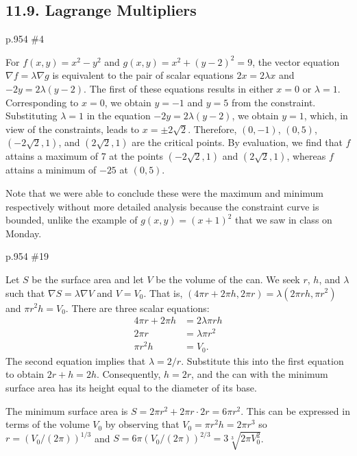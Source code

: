\subsection{11.9. Lagrange Multipliers}
\begin{practice}p.954 \#4\end{practice}
\begin{pracsol}
  For $f(x,y)=x^2-y^2$ and $g(x,y)=x^2+(y-2)^2=9$, the vector equation $\nabla f=\lambda \nabla g$ is equivalent to the pair of scalar equations $2x=2\lambda x$ and $-2y=2\lambda(y-2)$. The first of these equations results in either $x=0$ or $\lambda=1$. Corresponding to $x=0$, we obtain $y=-1$ and $y=5$ from the constraint. Substituting $\lambda=1$ in the equation $-2y=2\lambda(y-2)$, we obtain $y=1$, which, in view of the constraints, leads to $x=\pm2\sqrt2$. Therefore, $(0,-1)$, $(0,5)$, $(-2\sqrt2,1)$, and $(2\sqrt2,1)$ are the critical points. By evaluation, we find that $f$ attains a maximum of 7 at the points $(-2\sqrt2,1)$ and $(2\sqrt2,1)$, whereas $f$ attains a minimum of $-25$ at $(0,5)$.

  Note that we were able to conclude these were the maximum and minimum respectively without more detailed analysis because the constraint curve is bounded, unlike the example of $g(x,y)=(x+1)^2$ that we saw in class on Monday.
\end{pracsol}
\begin{practice}p.954 \#19\end{practice}
\begin{pracsol}
  Let $S$ be the surface area and let $V$ be the volume of the can. We seek $r$, $h$, and $\lambda$ such that $\nabla S=\lambda\nabla V$ and $V=V_0$. That is, $(4\pi r+2\pi h,2\pi r)=\lambda(2\pi rh,\pi r^2)$ and $\pi r^2h=V_0$. There are three scalar equations:
  \begin{align*}
    4\pi r+2\pi h &= 2\lambda\pi r h\\
    2\pi r &= \lambda\pi r^2\\
    \pi r^2h &= V_0.
  \end{align*}
  The second equation implies that $\lambda=2/r$. Substitute this into the first equation to obtain $2r+h=2h$. Consequently, $h=2r$, and the can with the minimum surface area has its height equal to the diameter of its base.

  The minimum surface area is $S=2\pi r^2+2\pi r\cdot 2r=6\pi r^2$. This can be expressed in terms of the volume $V_0$ by observing that $V_0=\pi r^2h=2\pi r^3$ so $r=(V_0/(2\pi))^{1/3}$ and $S=6\pi(V_0/(2\pi))^{2/3}=3\sqrt[3]{2\pi V_0^2}$.
\end{pracsol}
